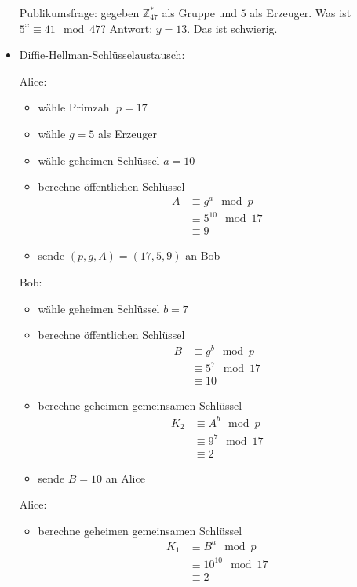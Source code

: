 \documentclass[
  a4paper,
  11pt,
]{article}
\newcommand{\Z}{\mathbb{Z}}
\begin{document}
\begin{itemize}
    Publikumsfrage: gegeben $\Z_{47}^*$ als Gruppe und $5$ als Erzeuger. Was ist
    $5^x \equiv 41 \mod 47$? Antwort: $y = 13$. Das ist schwierig.

  \item Diffie-Hellman-Schlüsselaustausch:

    Alice:
    \begin{itemize}
      \item wähle Primzahl $p = 17$
      \item wähle $g = 5$ als Erzeuger
      \item wähle geheimen Schlüssel $a = 10$
      \item berechne öffentlichen Schlüssel
        \begin{align*}
          A & \equiv g^a \mod p\\
            & \equiv 5^{10} \mod 17\\
            & \equiv 9
        \end{align*}
      \item sende $(p, g, A) = (17, 5, 9)$ an Bob
    \end{itemize}

    Bob:
    \begin{itemize}
      \item wähle geheimen Schlüssel $b = 7$
      \item berechne öffentlichen Schlüssel
        \begin{align*}
          B & \equiv g^b \mod p\\
            & \equiv 5^7 \mod 17\\
            & \equiv 10
        \end{align*}
      \item berechne geheimen gemeinsamen Schlüssel
        \begin{align*}
          K_2 & \equiv A^b \mod p\\
            & \equiv 9^7 \mod 17\\
            & \equiv 2
        \end{align*}
      \item sende $B = 10$ an Alice
    \end{itemize}

    Alice:
    \begin{itemize}
      \item berechne geheimen gemeinsamen Schlüssel
        \begin{align*}
          K_1 & \equiv B^a \mod p\\
            & \equiv 10^{10} \mod 17\\
            & \equiv 2
        \end{align*}
    \end{itemize}


\end{itemize}
\end{document}
